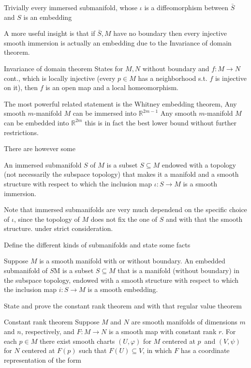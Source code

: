 Trivially every immersed submanifold, whose \( \iota \) is a diffeomorphism between \( \bar{S} \) and \( S \)  is an embedding

A more useful insight is that if \( \bar{S}, M \) have no boundary then every injective smooth immersion is actually an embedding
due to the Invariance of domain theorem.

Invariance of domain theorem
States for \( M, N \) without boundary and \( f : M \to N\) cont., which is locally injective
(every \( p \in M \) has a neighborhood s.t. \( f \) is injective on it), then \( f \) is an open
map and a local homeomorphism.

The most powerful related statement is the Whitney embedding theorem,
Any smooth \( m \)-manifold \( M \) can be immersed into \( \mathbb{R}^{2m-1} \)
Any smooth \( m \)-manifold \( M \) can be embedded into \( \mathbb{R}^{2m} \)
this is in fact the best lower bound without further restrictions.

There are however some 

An immersed submanifold \( S \) of \( M \) is a subset \( S \subseteq M \) endowed with a topology (not necessarily the subspace topology)
that makes it a manifold and a smooth structure with respect to which the inclusion map \( \iota : S \to M\) is a smooth immersion.

Note that immersed submanifolds are very much dependend on the specific choice of \( \iota \), since the topology of \( M \) does not fix the one of \( S \)
and with that the smooth structure.  under strict consideration.


Define the different kinds of submanifolds and state some facts

Suppose \( M \) is a smooth manifold with or without boundary. 
An embedded submanifold of \( S \)M is a subset \( S \subseteq M \) that is a manifold (without boundary) 
in the subspace topology, endowed with a smooth structure with respect to which the inclusion map
\( i : S \to M \) is a smooth embedding.


State and prove the constant rank theorem and with that regular value theorem

Constant rank theorem
Suppose \( M \) and \( N \) are smooth manifolds of dimensions \( m \) and \( n \), respectively, and \( F:M\rightarrow N \) is a smooth map with constant rank \( r \). 
For each \( p\in M \) there exist smooth charts \((U, \varphi)\) for \( M \) centered at \( p \) and \((V, \psi)\) for \( N \) centered at \( F(p) \) such that \( F(U)\subseteq V \), in which \( F \) has a coordinate representation of the form 

